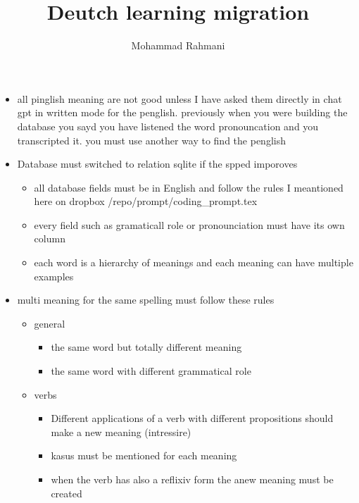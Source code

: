 \documentclass[a4paper]{article}
\title{Deutch learning migration}
\date{}
\author{Mohammad Rahmani}
\begin{document}
   \maketitle

   \begin{itemize}
      \item all pinglish meaning are not good unless I have asked them directly in chat gpt in written mode for the penglish. previously when you were building the database you sayd you have listened the word pronouncation and you transcripted it. you must use another way to find the penglish 
      \item Database must switched to relation sqlite if the spped imporoves
      \begin{itemize}
         \item all database fields must be in English and follow the rules I meantioned here on dropbox /repo/prompt/coding\_prompt.tex
         \item every field such as gramaticall role or pronounciation must have its own column
         \item each word is a hierarchy of meanings and each meaning can have multiple examples
      \end{itemize}
      \item multi meaning for the same spelling must follow these rules
      \begin{itemize}
         \item general
         \begin{itemize}
            \item the same word but totally different meaning
            \item the same word with different grammatical role
         \end{itemize}
         \item verbs
         \begin{itemize}
            \item Different applications of a verb with different propositions should make a new meaning (intressire)
            \item kasus must be mentioned for each meaning
            \item when the verb has also a reflixiv form the  anew meaning must be created
         \end{itemize}
      \end{itemize}
   \end{itemize}

   
   
\end{document}
